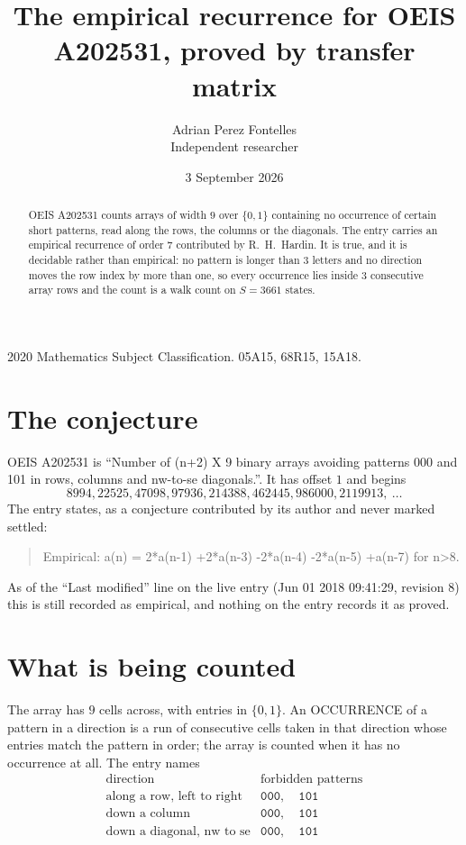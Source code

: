 \documentclass[11pt,a4paper]{article}
\title{The empirical recurrence for OEIS A202531, proved by transfer matrix}
\author{Adrian Perez Fontelles\\ \small Independent researcher}
\date{3 September 2026}
\theoremstyle{plain}
\theoremstyle{definition}
\begin{document}
\maketitle

\begin{abstract}
OEIS A202531 counts arrays of width $9$ over $\{0,1\}$ containing no occurrence of certain short
patterns, read along the rows, the columns or the diagonals. The entry carries an empirical
recurrence of order $7$ contributed by R.~H.~Hardin. It is true, and it is decidable
rather than empirical: no pattern is longer than $3$ letters and no direction moves the row
index by more than one, so every occurrence lies inside $3$ consecutive array rows and the
count is a walk count on $S=3661$ states.
\end{abstract}

\noindent\small 2020 Mathematics Subject Classification. 05A15, 68R15, 15A18.\normalsize

\section{The conjecture}

OEIS A202531 is ``Number of (n+2) X 9 binary arrays avoiding patterns 000 and 101 in rows, columns and nw-to-se diagonals.''. It has offset $1$ and begins
\[
8994, 22525, 47098, 97936, 214388, 462445, 986000, 2119913,\ \dots
\]
The entry states, as a conjecture contributed by its author and never marked settled:
\begin{quote}
Empirical: a(n) = 2*a(n-1) +2*a(n-3) -2*a(n-4) -2*a(n-5) +a(n-7) for n>8.
\end{quote}
As of the ``Last modified'' line on the live entry (Jun 01 2018 09:41:29, revision 8) this is still
recorded as empirical, and nothing on the entry records it as proved.

\section{What is being counted}

The array has $9$ cells across, with entries in $\{0,1\}$. An OCCURRENCE of a pattern in a
direction is a run of consecutive cells taken in that direction whose entries match the pattern
in order; the array is counted when it has no occurrence at all. The entry names
\[
\begin{array}{ll}
\text{direction} & \text{forbidden patterns} \\[2pt]
\text{along a row, left to right} & \mathtt{000},\quad \mathtt{101} \\
\text{down a column} & \mathtt{000},\quad \mathtt{101} \\
\text{down a diagonal, nw to se} & \mathtt{000},\quad \mathtt{101} \\
\end{array}
\]
\end{document}
